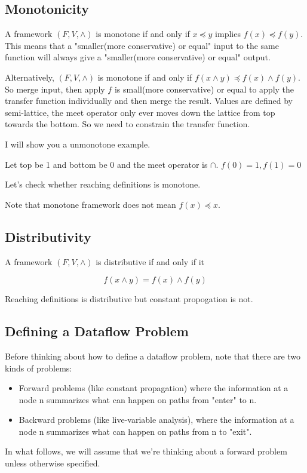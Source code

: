 \subsection{Monotonicity}


A framework \((F,V,\wedge)\) is monotone if and only if \(x \preceq y \) implies \(f(x) \preceq f(y)\). This means that
a "smaller(more conservative) or equal" input to the same function will always give a "smaller(more conservative)  or equal" output.



Alternatively, \((F,V,\wedge)\) is monotone if and only if \(  f(x \wedge y) \preceq f(x) \wedge f(y)\). So  merge input, then apply \(f\) is small(more conservative)  or equal to apply the transfer
function individually and then merge the result. Values are defined by semi-lattice, the meet operator only ever moves down the lattice from top towards the bottom.
So we need to constrain the transfer function.

I will show you a unmonotone example.

Let top be 1 and bottom be 0 and the meet operator is \(\cap\). \(f(0) = 1, f(1) = 0\)


Let's check whether reaching definitions is monotone.


Note that monotone framework does not mean \(f(x) \preceq  x\).



\subsection{Distributivity}

A framework \((F,V,\wedge)\) is distributive if and only if it

\[
	f(x \wedge y) = f(x) \wedge f(y)
\]



Reaching definitions is distributive but constant propogation is not.




\subsection{Defining a Dataflow Problem}


Before thinking about how to define a dataflow problem, note that there are two kinds of problems:
\begin{itemize}
\item Forward problems (like constant propagation) where the information at a node n summarizes what can happen on paths from "enter" to n.
\item Backward problems (like live-variable analysis), where the information at a node n summarizes what can happen on paths from n to "exit".


\end{itemize}	
In what follows, we will assume that we're thinking about a forward problem unless otherwise specified.

